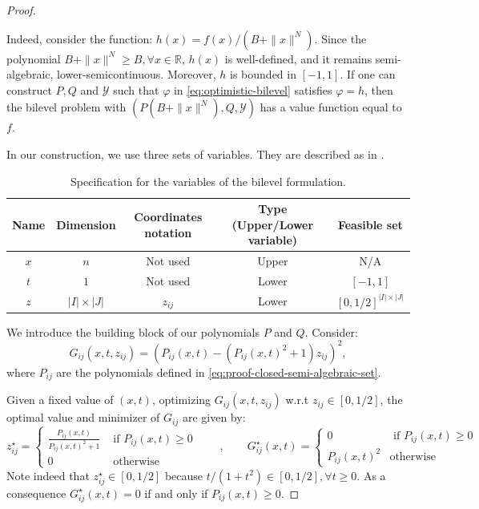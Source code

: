 \documentclass{article}
\newcommand*{\cY}{\mathcal{Y}}
\newcommand*{\RR}{\mathbb{R}}
\newcommand{\valbilevel}{\varphi}
\theoremstyle{plain}
\theoremstyle{definition}
\begin{document}
\begin{proof}
\begin{enumerate}[leftmargin=*]
       Indeed, consider the function: $h(x) = f(x) / (B + \|x\|^N)$. Since the polynomial $B + \|x\|^N \geq B, \forall x \in \RR$, $h(x)$ is well-defined, and it remains semi-algebraic, lower-semicontinuous. Moreover, $h$ is bounded in $[-1,1]$. If one can construct $P,Q$ and $\cY$ such that $\valbilevel$ in \eqref{eq:optimistic-bilevel} satisfies $\valbilevel = h$, then the bilevel problem with $(P(B + \|x\|^N), Q, \cY)$ has a value function equal to $f$.
    \end{enumerate}
    In our construction, we use three sets of variables. They are described as in .
    \begin{table}[bhtp]
        \centering
        \begin{tabular}{ccccc}
            \toprule
             Name & Dimension & Coordinates notation & Type (Upper/Lower variable) & Feasible set \\
             \midrule
             $x$ & $n$ & Not used & Upper& N/A\\ 
             \midrule
             $t$ & $1$ & Not used & Lower & $[-1,1]$\\
             \midrule
             $z$ & $|I| \times |J|$ & $z_{ij}$ & Lower & $[0,1/2]^{|I|\times|J|}$ \\
             \bottomrule
        \end{tabular}
        \caption{Specification for the variables of the bilevel formulation.}
        \label{tab:variables-lower-semicontinuous-function}
    \end{table}
    
    We introduce the building block of our polynomials $P$ and $Q$. Consider:
    \begin{equation*}
        G_{ij}(x,t,z_{ij}) = \left(P_{ij}(x,t) - (P_{ij}(x,t)^2 + 1)z_{ij}\right)^2,
    \end{equation*}
    where $P_{ij}$ are the polynomials defined in \eqref{eq:proof-closed-semi-algebraic-set}.
    
    Given a fixed value of $(x,t)$, optimizing $G_{ij}(x,t,z_{ij})$ w.r.t $z_{ij} \in [0, 1/2]$, the optimal value and minimizer of $G_{ij}$ are given by:
    \begin{equation}
        \label{eq:proof-semi-optimal-values}
        z_{ij}^\star = \begin{cases}
            \frac{P_{ij}(x,t)}{P_{ij}(x,t)^2 + 1} & \text{ if } P_{ij}(x,t) \geq 0\\
            0 & \text{ otherwise}
        \end{cases} \qquad, \qquad
        G_{ij}^\star(x,t) = \begin{cases}
            0 & \text{ if } P_{ij}(x,t) \geq 0\\
            P_{ij}(x,t)^2 & \text{otherwise}
        \end{cases}
    \end{equation}
    Note indeed that $z^\star_{ij} \in [0, 1/2]$ because $t/(1 + t^2) \in [0,1/2], \forall t \geq 0$. As a consequence $G^\star_{ij}(x,t) = 0$ if and only if $P_{ij}(x,t) \geq 0$. 


\end{proof}
\end{document}
